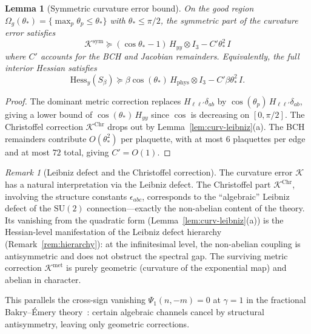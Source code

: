 \documentclass[11pt,a4paper]{article}
\theoremstyle{plain}
\newtheorem{lemma}[theorem]{Lemma}
\theoremstyle{definition}
\theoremstyle{remark}
\newtheorem{remark}[theorem]{Remark}
\newcommand{\SU}{\mathrm{SU}}
\newcommand{\Hess}{\mathrm{Hess}}
\newcommand{\cK}{\mathcal{K}}
\begin{document}
\begin{lemma}[Symmetric curvature error bound]\label{lem:curv-bound}
On the good region $\Omega_g(\theta_*) = \{\max_p \theta_p \leq \theta_*\}$
with $\theta_* \leq \pi/2$, the symmetric part of the curvature error
satisfies
\begin{equation}
\cK^{\mathrm{sym}} \succeq (\cos\theta_* - 1)\,H_{yy} \otimes I_3
- C'\theta_*^2\,I
\end{equation}
where $C'$ accounts for the BCH and Jacobian remainders.
Equivalently, the full interior Hessian satisfies
\begin{equation}
\Hess_y(S_\beta) \succeq
\beta\cos(\theta_*)\,H_{\mathrm{phys}} \otimes I_3
- C'\beta\theta_*^2\,I.
\end{equation}
\end{lemma}

\begin{proof}
The dominant metric correction replaces $H_{\ell\ell'}\delta_{ab}$ by
$\cos(\theta_p)\,H_{\ell\ell'}\delta_{ab}$, giving a lower bound of
$\cos(\theta_*)\,H_{yy}$ since $\cos$ is decreasing on $[0,\pi/2]$.
The Christoffel correction $\cK^{\mathrm{Chr}}$ drops out by
Lemma~\ref{lem:curv-leibniz}(a). The BCH remainders contribute
$O(\theta_*^2)$ per plaquette, with at most $6$ plaquettes per edge
and at most $72$ total, giving $C' = O(1)$.
\end{proof}

\begin{remark}[Leibniz defect and the Christoffel correction]
The curvature error $\cK$ has a natural interpretation via the
Leibniz defect. The Christoffel part $\cK^{\mathrm{Chr}}$, involving
the structure constants $\epsilon_{abc}$, corresponds to the
``algebraic'' Leibniz defect of the $\SU(2)$ connection---exactly
the non-abelian content of the theory. Its vanishing from the
quadratic form (Lemma~\ref{lem:curv-leibniz}(a)) is the Hessian-level
manifestation of the Leibniz defect hierarchy
(Remark~\ref{rem:hierarchy}): at the infinitesimal level, the
non-abelian coupling is antisymmetric and does not obstruct the
spectral gap. The surviving metric correction $\cK^{\mathrm{met}}$
is purely geometric (curvature of the exponential map) and abelian
in character.

This parallels the cross-sign vanishing $\Psi_1(n,-m) = 0$ at
$\gamma = 1$ in the fractional Bakry--\'Emery
theory~\cite{Fontes2026f}: certain algebraic channels cancel by
structural antisymmetry, leaving only geometric corrections.
\end{remark}
\end{document}
